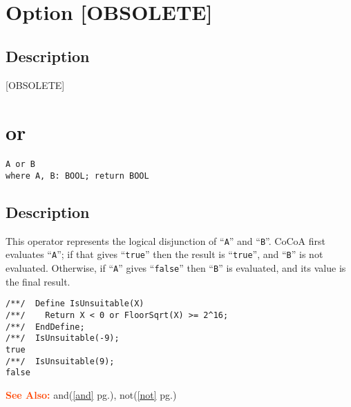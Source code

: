 \documentclass[a4paper]{mybook}
\newenvironment{command}{}{} %
\newcommand\SeeAlso{\par\textcolor{OrangeRed}{\textbf{\large See Also: }}}
\begin{document}
\section{Option [OBSOLETE]}
\label{Option [OBSOLETE]}
\begin{command} %



\subsection*{Description}

[OBSOLETE]

\end{command} %

\section{or}
\label{or}
\begin{command} %


\begin{Verbatim}[label=syntax, rulecolor=\color{MidnightBlue},
frame=single]
A or B
where A, B: BOOL; return BOOL
\end{Verbatim}


\subsection*{Description}

This operator represents the logical disjunction of ``\verb&A&'' and ``\verb&B&''.
CoCoA first evaluates ``\verb&A&''; if that gives ``\verb&true&'' then the result is
``\verb&true&'', and ``\verb&B&'' is not evaluated.  Otherwise, if ``\verb&A&'' gives
``\verb&false&'' then ``\verb&B&'' is evaluated, and its value is the final result.
\begin{Verbatim}[label=example, rulecolor=\color{PineGreen}, frame=single]
/**/  Define IsUnsuitable(X)
/**/    Return X < 0 or FloorSqrt(X) >= 2^16;
/**/  EndDefine;
/**/  IsUnsuitable(-9);
true
/**/  IsUnsuitable(9);
false
\end{Verbatim}


\SeeAlso %
  and(\ref{and} pg.\pageref{and}), 
    not(\ref{not} pg.\pageref{not})
\end{command} %
\end{document}
